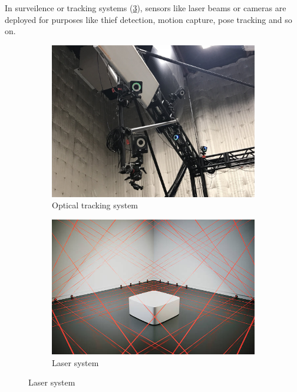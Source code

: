 In surveilence or tracking systems (\ref{fig:intro-laser}), 
sensors like laser beams or cameras are deployed for purposes like thief detection, 
motion capture, pose tracking and so on. 
\begin{figure}[ht] 
    \centering 
    
    \begin{subfigure}[b]{0.41\textwidth} 
        \includegraphics[width=\textwidth]{figures/optitrack.jpg} 
        \caption{Optical tracking system} 
        \label{fig:intro-optitrack} 
    \end{subfigure} 
    \hfill
    \begin{subfigure} [b]{0.46\textwidth} 
        \includegraphics[width=\textwidth]{figures/laser.jpg} 
        \caption{Laser system} 
        \label{fig:intro-laser} 
    \end{subfigure} 
\end{figure}

